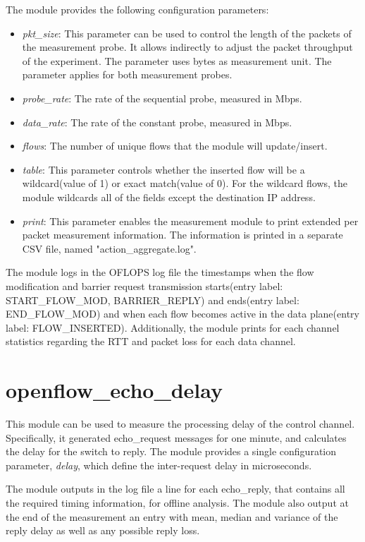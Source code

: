 \documentclass{book}
\begin{document}
  The module provides the following configuration parameters: 
  \begin{itemize}
  \item \emph{pkt\_size}: This parameter can be used to control the length of the
  packets of the measurement probe. It allows indirectly to adjust the packet
  throughput of the experiment. The parameter uses bytes as measurement unit.
  The parameter applies for both measurement probes. 
  \item \emph{probe\_rate}: The rate of the sequential probe, measured in Mbps. 
  \item \emph{data\_rate}: The rate of the constant probe, measured in Mbps. 
  \item \emph{flows}:  The number of unique flows that the module will
  update/insert.
  \item \emph{table}:  This parameter controls whether the inserted flow will be
  a wildcard(value of 1) or exact match(value of 0). For the wildcard flows, the
  module wildcards all of the fields except the destination IP address. 
  \item \emph{print}: This parameter enables the measurement module to print
  extended per packet measurement information. The information is printed in a
  separate CSV file, named "action\_aggregate.log".
  \end{itemize}

  The module logs in the OFLOPS log file the timestamps when the flow
  modification and barrier request transmission starts(entry label:
      START\_FLOW\_MOD, BARRIER\_REPLY) 
  and ends(entry label: END\_FLOW\_MOD) and when each flow becomes active in the data 
  plane(entry label: FLOW\_INSERTED). Additionally, the module prints for each
  channel statistics regarding the RTT and packet loss for each data channel. 

  \section{openflow\_echo\_delay}

  This module can be used to measure the processing delay of the control channel.
  Specifically, it generated echo\_request messages for one minute, and calculates the delay
  for the switch to reply. The module provides a single configuration 
  parameter, \emph{delay}, which define the inter-request delay in microseconds. 

  The module outputs in the log file a line for each echo\_reply, that
  contains all the required timing information, for offline analysis. The
  module also output at the end of the measurement an entry with mean, median and
  variance of the reply delay as well as any possible reply loss. 
\end{document}
